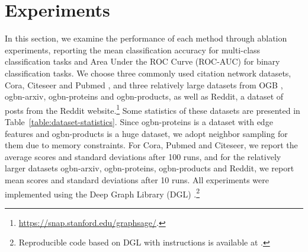\documentclass[sigconf,screen,nonacm]{acmart} \usepackage{booktabs}
\begin{document}
	\section{Experiments}
In this section, we examine the performance of each method through ablation experiments, reporting the mean classification accuracy for multi-class classification tasks and Area Under the ROC Curve (ROC-AUC) for binary classification tasks. We choose three commonly used citation network datasets, Cora, Citeseer and Pubmed \citep{DBLP:journals/aim/SenNBGGE08}, and three relatively large datasets from OGB \citep{hu2020open}, ogbn-arxiv, ogbn-proteins and ogbn-products, as well as Reddit, a dataset of posts from the Reddit website.\footnote{\url{https://snap.stanford.edu/graphsage/}.}
	Some statistics of these datasets are presented in Table~\ref{table:dataset-statistics}.
	Since ogbn-proteins is a dataset with edge features and ogbn-products is a huge dataset, we adopt neighbor sampling for them due to memory constraints.
	For Cora, Pubmed and Citeseer, we report the average scores and standard deviations after 100 runs, and for the relatively larger datasets ogbn-arxiv, ogbn-proteins, ogbn-products and Reddit, we report mean scores and standard deviations after 10 runs.
All experiments were implemented using the Deep Graph Library (DGL) \citep{wang2019deep}.\footnote{Reproducible code based on DGL with instructions is available at .} 


	\begin{table}[t]
\caption{Datasets statistics, where \textit{label rate} denotes the proportion of labeled nodes used for training to the total nodes.}
\label{table:dataset-statistics}
		\begin{center} 
		\end{center}
\end{table}
	
\end{document}
